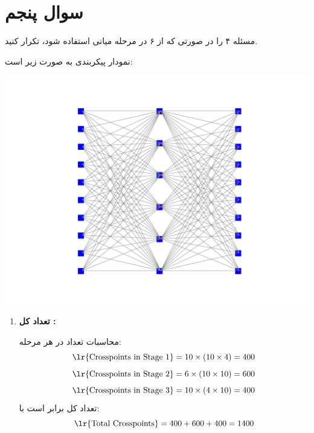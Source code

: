 \section{سوال پنجم}

مسئله ۴ را در صورتی که از ۶  در مرحله میانی استفاده شود، تکرار کنید.

\begin{qsolve}
	    نمودار پیکربندی به صورت زیر است:
\end{qsolve}
	    
\begin{center}
	\includegraphics*[width=1\linewidth]{pics/img8.pdf}
	\label{پیکربندی سوال ۵}
\end{center}
	
\begin{qsolve}
	
	\begin{enumerate}[label=\arabic*.]
		
		\item \textbf{تعداد کل :}
		
		محاسبات تعداد  در هر مرحله:
		\[
		\text{\lr{Crosspoints in Stage 1}} = 10 \times (10 \times 4) = 400
		\]
		\[
		\text{\lr{Crosspoints in Stage 2}} = 6 \times (10 \times 10) = 600
		\]
		\[
		\text{\lr{Crosspoints in Stage 3}} = 10 \times (4 \times 10) = 400
		\]
		تعداد کل  برابر است با:
		\[
		\text{\lr{Total Crosspoints}} = 400 + 600 + 400 = 1400
		\]

	\end{enumerate}	
\end{qsolve}
\newpage

